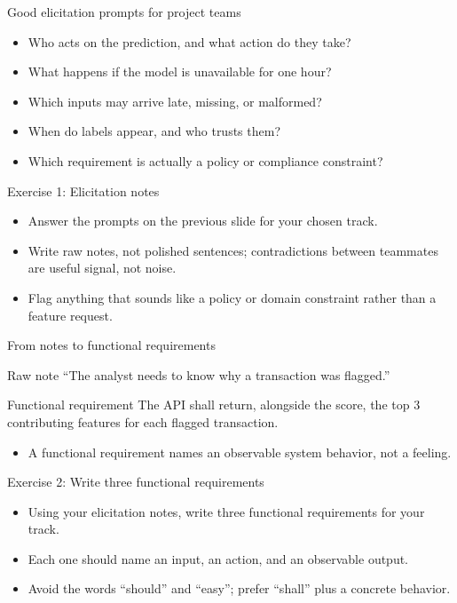 \begin{frame}{Good elicitation prompts for project teams}
\begin{itemize}
\item Who acts on the prediction, and what action do they take?
\item What happens if the model is unavailable for one hour?
\item Which inputs may arrive late, missing, or malformed?
\item When do labels appear, and who trusts them?
\item Which requirement is actually a policy or compliance constraint?
\end{itemize}
\coursefooter
\end{frame}

\begin{frame}{Exercise 1: Elicitation notes}
\begin{itemize}
\item Answer the prompts on the previous slide for your chosen track.
\item Write raw notes, not polished sentences; contradictions between teammates are useful signal, not noise.
\item Flag anything that sounds like a policy or domain constraint rather than a feature request.
\end{itemize}
\coursefooter
\end{frame}

\begin{frame}{From notes to functional requirements}
\begin{block}{Raw note}
``The analyst needs to know why a transaction was flagged.''
\end{block}
\begin{block}{Functional requirement}
The API shall return, alongside the score, the top 3 contributing features for each flagged transaction.
\end{block}
\begin{itemize}
\item A functional requirement names an observable system behavior, not a feeling.
\end{itemize}
\coursefooter
\end{frame}

\begin{frame}{Exercise 2: Write three functional requirements}
\begin{itemize}
\item Using your elicitation notes, write three functional requirements for your track.
\item Each one should name an input, an action, and an observable output.
\item Avoid the words ``should'' and ``easy''; prefer ``shall'' plus a concrete behavior.
\end{itemize}
\coursefooter
\end{frame}

